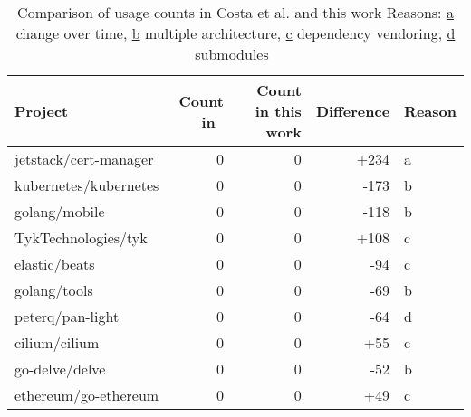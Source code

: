 \begin{table}[h]
    \centering
    \caption[Comparison of \unsafe{} usage numbers Costa et al. and this work]%
    {Comparison of \unsafe{} usage counts in Costa et al. and this work \newline \footnotesize
    Reasons: \underline{a} change over time, \underline{b} multiple architecture, \underline{c} dependency vendoring,
    \underline{d} submodules~\newline}
    \label{tbl:costa-numbers-comparison}
    \begin{tabular}{l|r|r|r|l}
        \toprule
        Project & Count in~\cite{costa2020} & Count in this work & Difference & Reason \\
        \midrule
        jetstack/cert-manager  & 0  & 0  & +234  & a \\
        kubernetes/kubernetes  & 0  & 0  & -173  & b \\
        golang/mobile          & 0  & 0  & -118  & b \\
        TykTechnologies/tyk    & 0  & 0  & +108  & c \\
        elastic/beats          & 0  & 0  & -94   & c \\
        golang/tools           & 0  & 0  & -69   & b \\
        peterq/pan-light       & 0  & 0  & -64   & d \\
        cilium/cilium          & 0  & 0  & +55   & c \\
        go-delve/delve         & 0  & 0  & -52   & b \\
        ethereum/go-ethereum   & 0  & 0  & +49   & c \\
        \bottomrule
    \end{tabular}
\end{table}